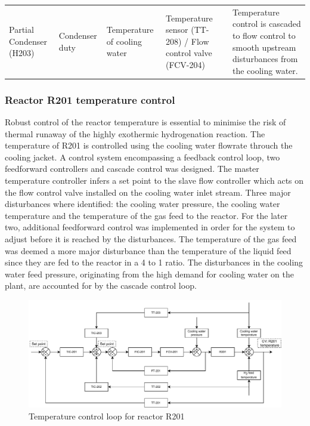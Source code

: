 \begin{table}[h]
{\begin{tabular}{p{3cm}|p{3cm}|p{4cm}|p{5cm}|p{6cm}}
                                            &                                             &                                                         &                                                                            &                                                                                                                                      \\ \midrule
Partial Condenser (H203)                    & Condenser duty                              & Temperature of cooling water                            & Temperature sensor (TT-208) / Flow control valve (FCV-204)                 & Temperature control is cascaded to flow control to smooth upstream   disturbances from the cooling water.                            \\ \bottomrule
\end{tabular}}
\end{table}


\subsubsection{Reactor R201 temperature control} %
Robust control of the reactor temperature is essential to minimise the risk of thermal runaway of the highly exothermic hydrogenation reaction. The temperature of R201 is controlled using the cooling water flowrate throuch the cooling jacket. A control system encompassing a feedback control loop, two feedforward controllers and cascade control was designed. The master temperature controller infers a set point to the slave flow controller which acts on the flow control valve installed on the cooling water inlet stream. Three major disturbances where identified: the cooling water pressure, the cooling water temperature and the temperature of the gas feed to the reactor. For the later two, additional feedforward control was implemented in order for the system to adjust before it is reached by the disturbances. The temperature of the gas feed was deemed a more major disturbance than the temperature of the liquid feed since they are fed to the reactor in a 4 to 1 ratio. The disturbances in the cooling water feed pressure, originating from the high demand for cooling water on the plant, are accounted for by the cascade control loop.

\begin{figure}[H]
    \centering
    \includegraphics[width=0.8\linewidth]{chapters/4-operation-control/4-Figures/R201-TC.pdf}
    \caption{Temperature control loop for reactor R201}
    \label{fig:R201-TC}
\end{figure}

